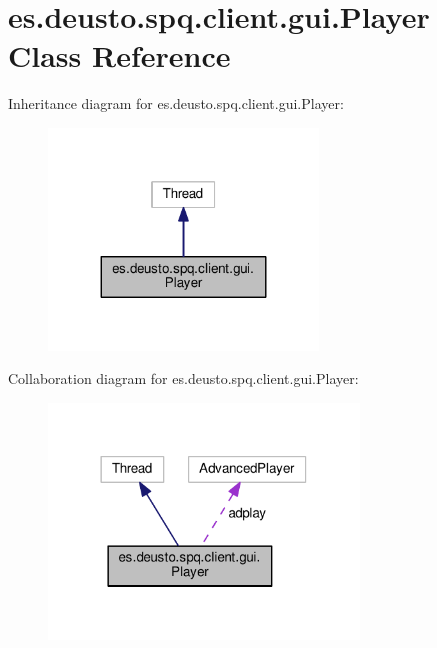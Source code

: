 \hypertarget{classes_1_1deusto_1_1spq_1_1client_1_1gui_1_1_player}{}\section{es.\+deusto.\+spq.\+client.\+gui.\+Player Class Reference}
\label{classes_1_1deusto_1_1spq_1_1client_1_1gui_1_1_player}


Inheritance diagram for es.\+deusto.\+spq.\+client.\+gui.\+Player\+:\nopagebreak
\begin{figure}[H]
\begin{center}
\leavevmode
\includegraphics[width=203pt]{classes_1_1deusto_1_1spq_1_1client_1_1gui_1_1_player__inherit__graph}
\end{center}
\end{figure}


Collaboration diagram for es.\+deusto.\+spq.\+client.\+gui.\+Player\+:\nopagebreak
\begin{figure}[H]
\begin{center}
\leavevmode
\includegraphics[width=234pt]{classes_1_1deusto_1_1spq_1_1client_1_1gui_1_1_player__coll__graph}
\end{center}
\end{figure}
